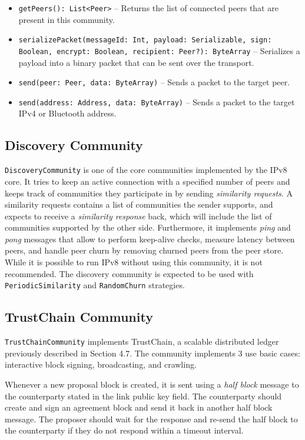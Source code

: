 \begin{itemize}
    \item \texttt{getPeers(): List<Peer>} – Returns the list of connected peers that are present in this community.
    \item \texttt{serializePacket(messageId: Int, payload: Serializable, sign: Boolean, encrypt: Boolean, recipient: Peer?): ByteArray} – Serializes a payload into a binary packet that can be sent over the transport.
    \item \texttt{send(peer: Peer, data: ByteArray)} – Sends a packet to the target peer.
    \item \texttt{send(address: Address, data: ByteArray)} – Sends a packet to the target IPv4 or Bluetooth address.
\end{itemize}

\subsection{Discovery Community}

\texttt{DiscoveryCommunity} is one of the core communities implemented by the IPv8 core. It tries to keep an active connection with a specified number of peers and keeps track of communities they participate in by sending \textit{similarity requests}. A similarity requests contains a list of communities the sender supports, and expects to receive a \textit{similarity response} back, which will include the list of communities supported by the other side. Furthermore, it implements \textit{ping} and \textit{pong} messages that allow to perform keep-alive checks, measure latency between peers, and handle peer churn by removing churned peers from the peer store. While it is possible to run IPv8 without using this community, it is not recommended. The discovery community is expected to be used with \texttt{PeriodicSimilarity} and \texttt{RandomChurn} strategies.

\subsection{TrustChain Community}

\texttt{TrustChainCommunity} implements TrustChain, a scalable distributed ledger previously described in Section 4.7. The community implements 3 use basic cases: interactive block signing, broadcasting, and crawling.

Whenever a new proposal block is created, it is sent using a \textit{half block} message to the counterparty stated in the link public key field. The counterparty should create and sign an agreement block and send it back in another half block message. The proposer should wait for the response and re-send the half block to the counterparty if they do not respond within a timeout interval.

